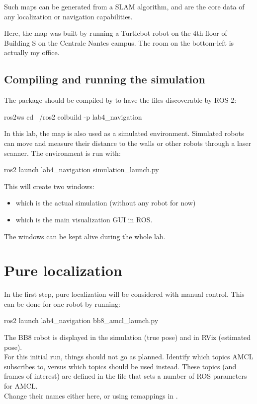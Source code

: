 \documentclass{ecnreport}
\begin{document}
Such maps can be generated from a SLAM algorithm, and are the core data of any localization or navigation capabilities.

Here, the map was built by running a Turtlebot robot on the 4th floor of Building S on the Centrale Nantes campus. The room on the bottom-left is actually my office.


\subsection{Compiling and running the simulation}

The package should be compiled by  to have the files discoverable by ROS 2:
\begin{bashcodelarge}
 ros2ws
 cd ~/ros2
 colbuild -p lab4_navigation
\end{bashcodelarge}

In this lab, the map is also used as a simulated environment. Simulated robots can move and measure their distance to the walls or other robots through a laser scanner. The environment is run with:
\begin{bashcodelarge}
 ros2 launch lab4_navigation simulation_launch.py 
\end{bashcodelarge}This will create two windows:
\begin{itemize}
 \item {} which is the actual simulation (without any robot for now)
 \item {} which is the main visualization GUI in ROS.
\end{itemize}
The windows can be kept alive during the whole lab.

\newpage

\section{Pure localization}

In the first step, pure localization will be considered with manual control. This can be done for one robot by running:
\begin{bashcodelarge}
 ros2 launch lab4_navigation bb8_amcl_launch.py
\end{bashcodelarge}
The BB8 robot is displayed in the simulation (true pose) and in RViz (estimated pose).\\

For this initial run, things should not go as planned. Identify which topics AMCL subscribes to, versus which topics should be used instead. These topics (and frames of interest) are defined in the file  that sets a number of ROS parameters for AMCL. \\Change their names either here, or using remappings in .
\end{document}

